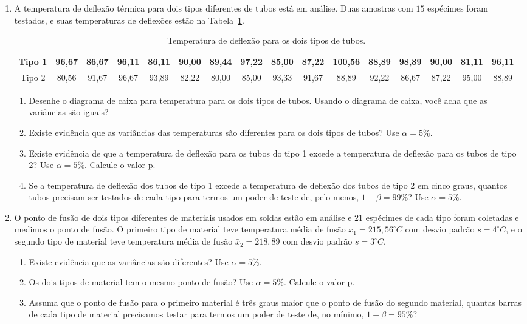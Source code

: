 \documentclass[8pt, a4paper]{article}
\begin{document}
\begin{enumerate}
	\item A temperatura de deflexão térmica para dois tipos diferentes de tubos está em análise. Duas amostras com $15$ espécimes foram testados, e suas temperaturas de deflexões estão na Tabela~\ref{tab:deflection-temp}.
	\begin{table}[ht]
		\centering
		\begin{tabular}{c|ccccccccccccccc}
			\toprule[0.05cm]
			Tipo 1 & 96,67 & 86,67 & 96,11 & 86,11 & 90,00 & 89,44 & 97,22 & 85,00 & 87,22 & 100,56 & 88,89 & 98,89 & 90,00 & 81,11 & 96,11 \\ \midrule[0.025cm]
			Tipo 2 & 80,56 & 91,67 & 96,67 & 93,89 & 82,22 & 80,00 & 85,00 & 93,33 & 91,67 & 88,89 & 92,22 & 86,67 & 87,22 & 95,00 & 88,89 \\ 
			\bottomrule[0.05cm]
		\end{tabular}
		\caption{Temperatura de deflexão para os dois tipos de tubos.} 
		\label{tab:deflection-temp}
	\end{table}
	\begin{enumerate}
		\item Desenhe o diagrama de caixa para temperatura para os dois tipos de tubos. Usando o diagrama de caixa, você acha que as variâncias são iguais?
		\item Existe evidência que as variâncias das temperaturas são diferentes para os dois tipos de tubos? Use $\alpha=5\%$.
		\item Existe evidência de que a temperatura de deflexão para os tubos do tipo 1 excede a temperatura de deflexão para os tubos de tipo 2? Use $\alpha=5\%$. Calcule o valor-p.
		\item Se a temperatura de deflexão dos tubos de tipo 1 excede a temperatura de deflexão dos tubos de tipo 2 em cinco graus, quantos tubos precisam ser testados de cada tipo para termos um poder de teste de, pelo menos, $1-\beta = 99\%$? Use $\alpha = 5\%$.
	\end{enumerate}

	\item O ponto de fusão de dois tipos diferentes de materiais usados em soldas estão em análise e $21$ espécimes de cada tipo foram  coletadas e medimos o ponto de fusão. O primeiro tipo de material teve temperatura média de fusão $\bar{x}_1=215,56^\circ C$ com desvio padrão $s=4^\circ C$, e o segundo tipo de material teve temperatura média de fusão $\bar{x}_2=218,89$ com desvio padrão $s=3^\circ C$. 
	\begin{enumerate}
		\item Existe evidência que as variâncias são diferentes? Use $\alpha = 5\%$.
		\item Os dois tipos de material tem o mesmo ponto de fusão? Use $\alpha = 5\%$. Calcule o valor-p.
		\item Assuma que o ponto de fusão para o primeiro material é três graus maior que o ponto de fusão do segundo material, quantas barras de cada tipo de material precisamos testar para termos um poder de teste de, no mínimo, $1-\beta = 95\%$?
	\end{enumerate}
	

\end{enumerate}
\end{document}
